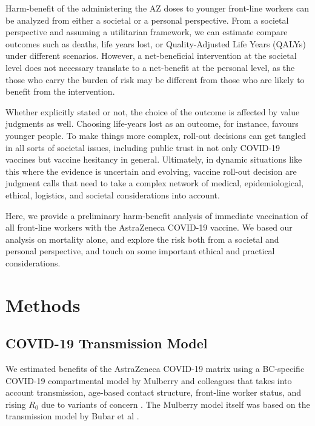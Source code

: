 \documentclass[]{interact}
\theoremstyle{plain}%
\theoremstyle{definition}
\theoremstyle{remark}
\begin{document}
Harm-benefit of the administering the AZ doses to younger front-line
workers can be analyzed from either a societal or a personal
perspective. From a societal perspective and assuming a utilitarian
framework, we can estimate compare outcomes such as deaths, life years
lost, or Quality-Adjusted Life Years (QALYs) under different scenarios.
However, a net-beneficial intervention at the societal level does not
necessary translate to a net-benefit at the personal level, as the those
who carry the burden of risk may be different from those who are likely
to benefit from the intervention.

Whether explicitly stated or not, the choice of the outcome is affected
by value judgments as well. Choosing life-years lost as an outcome, for
instance, favours younger people. To make things more complex, roll-out
decisions can get tangled in all sorts of societal issues, including
public trust in not only COVID-19 vaccines but vaccine hesitancy in
general. Ultimately, in dynamic situations like this where the evidence
is uncertain and evolving, vaccine roll-out decision are judgment calls
that need to take a complex network of medical, epidemiological,
ethical, logistics, and societal considerations into account.

Here, we provide a preliminary harm-benefit analysis of immediate
vaccination of all front-line workers with the AstraZeneca COVID-19
vaccine. We based our analysis on mortality alone, and explore the risk
both from a societal and personal perspective, and touch on some
important ethical and practical considerations.

\hypertarget{methods}{%
\section{Methods}\label{methods}}

\hypertarget{covid-19-transmission-model}{%
\subsection{COVID-19 Transmission
Model}\label{covid-19-transmission-model}}

We estimated benefits of the AstraZeneca COVID-19 matrix using a
BC-specific COVID-19 compartmental model by Mulberry and colleagues that
takes into account transmission, age-based contact structure, front-line
worker status, and rising \(R_0\) due to variants of concern
\citep{mulberry_vaccine_2021}. The Mulberry model itself was based on
the transmission model by Bubar et al \citep{bubar_model-informed_2021}.
\end{document}
